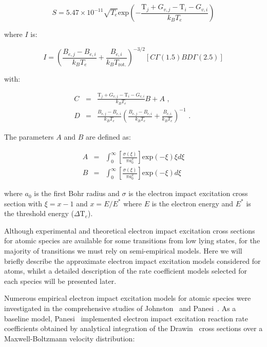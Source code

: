 \begin{equation}
 S = 5.47 \times 10^{-11} \sqrt{T_e} \text{exp} \left ( - \frac{\mathrm{T}_j + G_{v,j} - \mathrm{T}_i - G_{v,i} }{k_B T_e} \right )
\end{equation}

\noindent where $I$	 is:

\begin{equation}
 I = \left ( \frac{B_{e,j} - B_{e,i}}{k_B T_e} + \frac{B_{e,i}}{k_B T_\text{rot.}} \right )^{-3/2} \left [ C \Gamma(1.5) B D \Gamma(2.5) \right ]
\end{equation}

with:

\begin{eqnarray}
 C &=& \frac{\mathrm{T}_j + G_{v,j} - \mathrm{T}_i - G_{v,i} }{k_B T_e} B + A \text{ , } \\
 D &=& \frac{B_{e,j} - B_{e,i}}{k_B T_e} \left ( \frac{B_{e,j} - B_{e,i}}{k_B T_e} + \frac{B_{e,i}}{k_B T_e} \right )^{-1} \text{ . }
\end{eqnarray}

\noindent The parameters $A$ and $B$ are defined as:

\begin{eqnarray}
 A &=& \int_0^\infty \left [ \frac{\sigma(\xi)}{\pi a_0^2} \right ] \text{exp} ( -\xi ) \xi d \xi \\
 B &=& \int_0^\infty \left [ \frac{\sigma(\xi)}{\pi a_0^2} \right ] \text{exp} ( -\xi ) d \xi  \label{eq:without}
\end{eqnarray}

\noindent where $a_0$ is the first Bohr radius and $\sigma$ is the electron impact excitation cross section with $\xi = x -1$ and $x = E / E^\ast$ where $E$ is the electron energy and $E^\ast$ is the threshold energy ($\Delta \mathrm{T}_e$).

\par

Although experimental and theoretical electron impact excitation cross sections for atomic species are available for some transitions from low lying states, for the majority of transitions we must rely on semi-empirical models.
Here we will briefly describe the approximate electron impact excitation models considered for atoms, whilst a detailed description of the rate coefficient models selected for each species will be presented later.

\par

Numerous empirical electron impact excitation models for atomic species were investigated in the comprehensive studies of Johnston~\cite{JohnPhd} and Panesi~\cite{panesi_phd}.
As a baseline model, Panesi~\cite{panesi_phd} implemented electron impact excitation reaction rate coefficients obtained by analytical integration of the Drawin~\cite{drawin_1968} cross sections over a Maxwell-Boltzmann velocity distribution:


